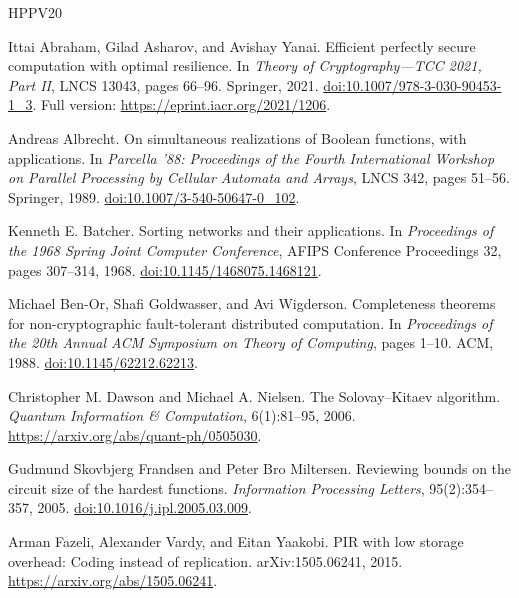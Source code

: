 \documentclass[11pt]{article}
\begin{document}
\clearpage
\begin{thebibliography}{HPPV20}
\small
{}

Ittai Abraham, Gilad Asharov, and Avishay Yanai.
\newblock Efficient perfectly secure computation with optimal resilience.
\newblock In \emph{Theory of Cryptography---TCC 2021, Part II}, LNCS 13043,
pages 66--96. Springer, 2021.
\newblock \href{https://doi.org/10.1007/978-3-030-90453-1_3}{doi:10.1007/978-3-030-90453-1\_3}.
\newblock Full version: \url{https://eprint.iacr.org/2021/1206}.

Andreas Albrecht.
\newblock On simultaneous realizations of Boolean functions, with applications.
\newblock In \emph{Parcella '88: Proceedings of the Fourth International
Workshop on Parallel Processing by Cellular Automata and Arrays}, LNCS 342,
pages 51--56. Springer, 1989.
\newblock \href{https://doi.org/10.1007/3-540-50647-0_102}{doi:10.1007/3-540-50647-0\_102}.

Kenneth E. Batcher.
\newblock Sorting networks and their applications.
\newblock In \emph{Proceedings of the 1968 Spring Joint Computer Conference},
AFIPS Conference Proceedings 32, pages 307--314, 1968.
\newblock \href{https://doi.org/10.1145/1468075.1468121}{doi:10.1145/1468075.1468121}.

Michael Ben-Or, Shafi Goldwasser, and Avi Wigderson.
\newblock Completeness theorems for non-cryptographic fault-tolerant
distributed computation.
\newblock In \emph{Proceedings of the 20th Annual ACM Symposium on Theory
of Computing}, pages 1--10. ACM, 1988.
\newblock \href{https://doi.org/10.1145/62212.62213}{doi:10.1145/62212.62213}.

Christopher M. Dawson and Michael A. Nielsen.
\newblock The Solovay--Kitaev algorithm.
\newblock \emph{Quantum Information \& Computation}, 6(1):81--95, 2006.
\newblock \url{https://arxiv.org/abs/quant-ph/0505030}.

Gudmund Skovbjerg Frandsen and Peter Bro Miltersen.
\newblock Reviewing bounds on the circuit size of the hardest functions.
\newblock \emph{Information Processing Letters}, 95(2):354--357, 2005.
\newblock \href{https://doi.org/10.1016/j.ipl.2005.03.009}{doi:10.1016/j.ipl.2005.03.009}.

Arman Fazeli, Alexander Vardy, and Eitan Yaakobi.
\newblock PIR with low storage overhead: Coding instead of replication.
\newblock arXiv:1505.06241, 2015.
\newblock \url{https://arxiv.org/abs/1505.06241}.


\end{thebibliography}
\end{document}
